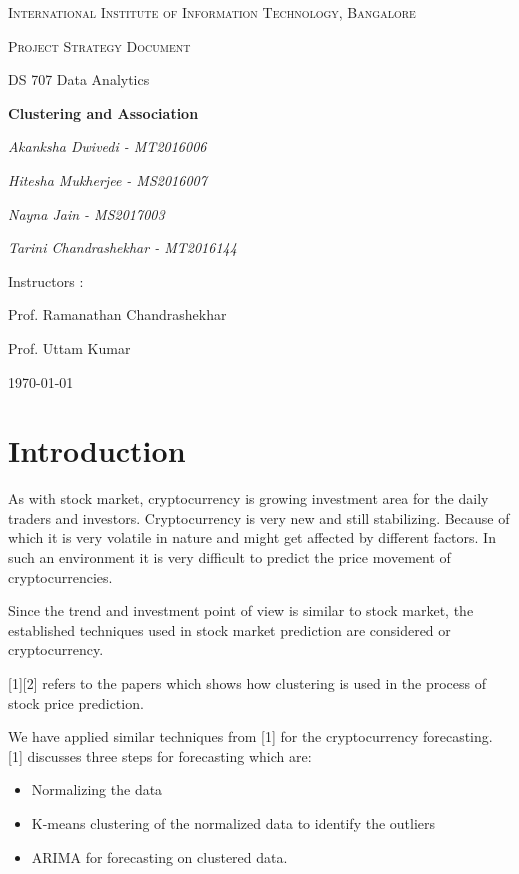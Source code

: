 \documentclass{article}
\begin{document}
\begin{titlepage}
	\centering
	{\scshape\LARGE International Institute of Information Technology, Bangalore \par}
	\vspace{1cm}
	{\scshape\Large Project Strategy Document\par}
	{\Large  DS 707 Data Analytics\par}
	\vspace{1.5cm}
	{\huge\bfseries Clustering and Association \par}
	\vspace{2cm}
	{\Large\itshape Akanksha Dwivedi - MT2016006\par}
	{\Large\itshape Hitesha Mukherjee - MS2016007\par}
	{\Large\itshape Nayna Jain - MS2017003\par}
	{\Large\itshape Tarini Chandrashekhar - MT2016144\par}
	\vfill
	Instructors : \par
	Prof. Ramanathan Chandrashekhar
	\par
	Prof. Uttam Kumar

	\vfill
	{\large \today\par}
\end{titlepage}

\newpage

\section{Introduction}
As with stock market, cryptocurrency is growing investment area for the daily traders and investors. Cryptocurrency is very new and still stabilizing. Because of which it is very volatile in nature and might get affected by different factors. In such an environment it is very difficult to predict the price movement of cryptocurrencies.

Since the trend and investment point of view is similar to stock market, the established techniques used in stock market prediction are considered
or cryptocurrency.

[1][2] refers to the papers which shows how clustering is used in the process of stock price prediction.

We have applied similar techniques from [1] for the cryptocurrency forecasting.
[1] discusses three steps for forecasting which are:
\begin{itemize}
	\item Normalizing the data
	\item K-means clustering of the normalized data to identify the outliers
	\item ARIMA for forecasting on clustered data.
\end{itemize}
\end{document}
